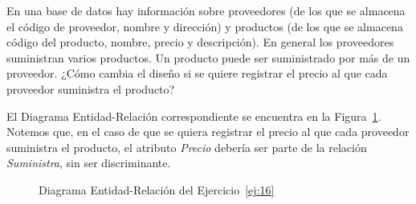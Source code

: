 \begin{ejercicio} \label{ej:16}
    En una base de datos hay información sobre proveedores (de los que se almacena el código de proveedor,
    nombre y dirección) y productos (de los que se almacena código del producto, nombre, precio y descripción).
    En general los proveedores suministran varios productos. Un producto puede ser suministrado por más de un
    proveedor. ¿Cómo cambia el diseño si se quiere registrar el precio al que cada proveedor suministra el
    producto?
    
    El Diagrama Entidad-Relación correspondiente se encuentra en la Figura~\ref{fig:ej16}.
    Notemos que, en el caso de que se quiera registrar el precio al que cada proveedor suministra el producto, el atributo \emph{Precio} debería ser parte de la relación \emph{Suministra}, sin ser discriminante.
    \begin{figure}
        \centering
        \caption{Diagrama Entidad-Relación del Ejercicio~\ref{ej:16}}
        \label{fig:ej16}
    \end{figure}
\end{ejercicio}


